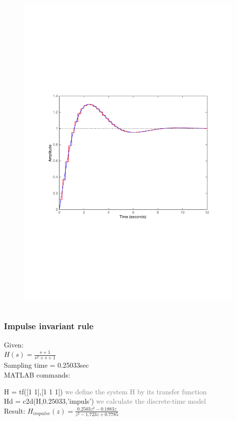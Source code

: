 \begin{frame}
\begin{columns}
\begin{column}{0.5\textwidth}
\begin{figure}
				\includegraphics[width=1\linewidth]{vb2}
			\end{figure}
		\end{column}
	\end{columns}
\end{frame}

\begin{frame}
	\frametitle{Impulse invariant rule}
	\begin{example}
		Given:\\
		$H(s) = \frac{s + 1}{s^{2} + s + 1}$\\
		Sampling time = 0.25033sec\\
		\vspace{1em}
		MATLAB commands:
		
		H = tf([1 1],[1 1 1]) \textcolor{gray}{we define the system H by its transfer function} \\
		Hd = c2d(H,$0.25033$,'impuls')	\textcolor{gray}{we calculate the discrete-time model}\\
		\vspace{1em}
		Result:
		$H_{impulse}(z) = \frac{0.2503z^{2} - 0.1883z}{z^{2} - 1.723z + 0.7785}$
	\end{example}
\end{frame}

